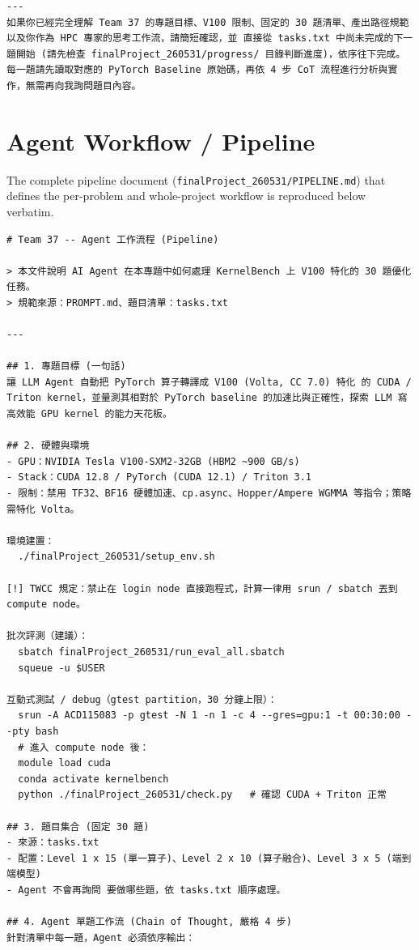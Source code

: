 \documentclass[conference]{IEEEtran}
\begin{document}
\begin{lstlisting}
---
如果你已經完全理解 Team 37 的專題目標、V100 限制、固定的 30 題清單、產出路徑規範以及你作為 HPC 專家的思考工作流，請簡短確認，並 直接從 tasks.txt 中尚未完成的下一題開始 (請先檢查 finalProject_260531/progress/ 目錄判斷進度)，依序往下完成。每一題請先讀取對應的 PyTorch Baseline 原始碼，再依 4 步 CoT 流程進行分析與實作，無需再向我詢問題目內容。
\end{lstlisting}

\section{Agent Workflow / Pipeline}
\label{app:pipeline}
The complete pipeline document (\texttt{finalProject\_260531/PIPELINE.md})
that defines the per-problem and whole-project workflow is reproduced below
verbatim.
\begin{lstlisting}
# Team 37 -- Agent 工作流程 (Pipeline)

> 本文件說明 AI Agent 在本專題中如何處理 KernelBench 上 V100 特化的 30 題優化任務。
> 規範來源：PROMPT.md、題目清單：tasks.txt

---

## 1. 專題目標 (一句話)
讓 LLM Agent 自動把 PyTorch 算子轉譯成 V100 (Volta, CC 7.0) 特化 的 CUDA / Triton kernel，並量測其相對於 PyTorch baseline 的加速比與正確性，探索 LLM 寫高效能 GPU kernel 的能力天花板。

## 2. 硬體與環境
- GPU：NVIDIA Tesla V100-SXM2-32GB (HBM2 ~900 GB/s)
- Stack：CUDA 12.8 / PyTorch (CUDA 12.1) / Triton 3.1
- 限制：禁用 TF32、BF16 硬體加速、cp.async、Hopper/Ampere WGMMA 等指令；策略需特化 Volta。

環境建置：
  ./finalProject_260531/setup_env.sh

[!] TWCC 規定：禁止在 login node 直接跑程式，計算一律用 srun / sbatch 丟到 compute node。

批次評測（建議）：
  sbatch finalProject_260531/run_eval_all.sbatch
  squeue -u $USER

互動式測試 / debug（gtest partition，30 分鐘上限）：
  srun -A ACD115083 -p gtest -N 1 -n 1 -c 4 --gres=gpu:1 -t 00:30:00 --pty bash
  # 進入 compute node 後：
  module load cuda
  conda activate kernelbench
  python ./finalProject_260531/check.py   # 確認 CUDA + Triton 正常

## 3. 題目集合 (固定 30 題)
- 來源：tasks.txt
- 配置：Level 1 x 15 (單一算子)、Level 2 x 10 (算子融合)、Level 3 x 5 (端到端模型)
- Agent 不會再詢問 要做哪些題，依 tasks.txt 順序處理。

## 4. Agent 單題工作流 (Chain of Thought, 嚴格 4 步)
針對清單中每一題，Agent 必須依序輸出：


\end{lstlisting}
\end{document}
